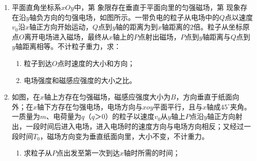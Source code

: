 \begin{enumerate}[leftmargin=0em]
\newpage
\item
{}
平面直角坐标系$ xOy $中，第  象限存在垂直于平面向里的匀强磁场，第  现象存在沿$ y $轴负方向的匀强电场，如图所示。一带负电的粒子从电场中的$ Q $点以速度$ v_{0} $沿$ x $轴正方向开始运动，$ Q $点到$ y $轴的距离为到$ x $轴距离的$ 2 $倍。粒子从坐标原点$ O $离开电场进入磁场，最终从$ x $轴上的$ P $点射出磁场，$ P $点到$ y $轴距离与$ Q $点到$ y $轴距离相等。不计粒子重力，求：
\begin{enumerate}
\renewcommand{\labelenumi}{\arabic{enumi}.}
\item
粒子到达$ O $点时速度的大小和方向；
\item 
电场强度和磁感应强度的大小之比。


\end{enumerate}
\begin{figure}[h!]
\flushright

\end{figure}



\newpage
\item
{}
如图，在$ x $轴上方存在匀强磁场，磁感应强度大小为$ B $，方向垂直于纸面向外；在$ x $轴下方存在匀强电场，电场方向与$ xoy $平面平行，且与$ x $轴成$ 45 ^{\circ} $夹角。一质量为$ m $、电荷量为$ q $（$ q $＞$ 0 $）的粒子以速度$ v_{0} $从$ y $轴上$ P $点沿$ y $轴正方向射出，一段时间后进入电场，进入电场时的速度方向与电场方向相反；又经过一段时间$ T_{0} $，磁场方向变为垂直纸面向里，大小不变，不计重力。
\begin{enumerate}
\renewcommand{\labelenumi}{\arabic{enumi}.}
\item
求粒子从$ P $点出发至第一次到达$ x $轴时所需的时间；


\end{enumerate}
\end{enumerate}
